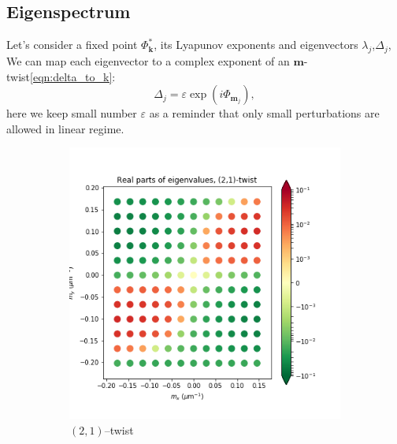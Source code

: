 \documentclass[a4paper,12pt]{article}
\renewcommand*{\vec}[1]{\mathbf{#1}}
\newcommand*{\eps}{\varepsilon}
\newcommand*{\F}{\Phi} %
\newcommand*{\FP}{\Phi^*}%
\newcommand*{\D}{\Delta}%
\begin{document}
\subsection{Eigenspectrum}
Let's consider a fixed point $\FP_{\vec{k}}$, its Lyapunov exponents and eigenvectors $\lambda_j$,$\D_j$, We can map each eigenvector to a complex exponent of an $\vec{m}$-twist\eqref{eqn:delta_to_k}:
\begin{equation}
\D_j = \eps \exp(i\F_{\vec{m}_j}),
\label{eqn:delta_to_m}
\end{equation}
here we keep small number $\eps$ as a reminder that only small perturbations are allowed in linear regime.

\begin{figure}[h]
\begin{subfigure}[h]{.55\textwidth}
  \centering
 \includegraphics[width=.9\textwidth]{assets/theory-2019-09-05-163844330-50c.png}
  \caption{$(2,1)$--twist}
\end{subfigure}
\begin{subfigure}[h]{.55\textwidth}
  \centering

\end{subfigure}
\end{figure}
\end{document}

